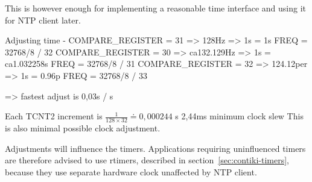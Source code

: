 
This is however enough for implementing a reasonable time interface and using it for NTP client later.



Adjusting time - COMPARE\_REGISTER = 31 => 128Hz => 1s = 1s
FREQ = 32768/8 / 32
COMPARE\_REGISTER = 30 => ca132.129Hz => 1s = ca1.032258s
FREQ = 32768/8 / 31
COMPARE\_REGISTER = 32 => 124.12per => 1s = 0.96p
FREQ = 32768/8 / 33

=> fastest adjust is 0,03s / s


Each TCNT2 increment is $\frac{1}{128 \times 32} \doteq 0,000244$ s
2,44ms minimum clock slew
This is also minimal possible clock adjustment.


Adjustments will influence the timers.
Applications requiring uninfluenced timers
are therefore advised to use rtimers, described in section~\ref{sec:contiki-timers},
because they use separate hardware clock
unaffected by NTP client.






